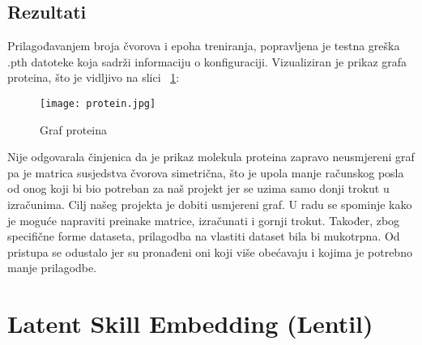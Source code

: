 \subsection{Rezultati}
Prilagođavanjem broja čvorova i epoha treniranja, popravljena je testna greška .pth datoteke koja sadrži informaciju o konfiguraciji. Vizualiziran je prikaz grafa proteina, što je vidljivo na slici ~\ref{fig:protein}:

\begin{figure}[!htb]
\centering
\texttt{[image: protein.jpg]}
\caption{Graf proteina}
\label{fig:protein}
\end{figure}
Nije odgovarala činjenica da je prikaz molekula proteina zapravo neusmjereni graf pa je matrica susjedstva čvorova simetrična, što je upola manje računskog posla od onog koji bi bio potreban za naš projekt jer se uzima samo donji trokut u izračunima. Cilj našeg projekta je dobiti usmjereni graf. U radu se spominje kako je moguće napraviti preinake matrice, izračunati i gornji trokut. Također, zbog specifične forme dataseta, prilagodba na vlastiti dataset bila bi mukotrpna. Od pristupa se odustalo jer su pronađeni oni koji više obećavaju i kojima je potrebno manje prilagodbe. 

\section{Latent Skill Embedding (Lentil)}
